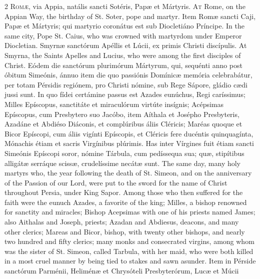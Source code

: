 \begin{paracol}{2}
\lettrine[lines=2]{R}{omæ,} via Appia, 
 natális sancti Sotéris, Papæ et Mártyris.
\switchcolumn
{}
\lettrine[lines=2]{A}{t} Rome, on the Appian Way, the 
 birthday of St. Soter, pope and martyr.
\switchcolumn*
{}
Item Romæ sancti Caji, 
 Papæ et Mártyris; qui martyrio coronátus est sub Diocletiáno Príncipe.
\switchcolumn
{}
In the same city, Pope St. Caius, 
 who was crowned with martyrdom under Emperor Diocletian.
\switchcolumn*
{}
Smyrnæ sanctórum 
 Apéllis et Lúcii, ex primis Christi discípulis.
\switchcolumn
{}
At Smyrna, the Saints Apelles and 
 Lucius, who were among the first disciples of Christ.
\switchcolumn*
{}
Eódem die sanctórum 
 plurimórum Mártyrum, qui, sequénti anno post óbitum Simeónis, ánnuo item die 
 quo passiónis Domínicæ memória celebrabátur, per totam Pérsidis regiónem, 
 pro Christi nómine, sub Rege Sápore, gládio cædi jussi sunt. In quo 
 fídei certámine passus est Azades eunúchus, Regi caríssimus; Milles 
 Epíscopus, sanctitáte et miraculórum virtúte insígnis; Acépsimas Epíscopus, 
 cum Presbytero suo Jacóbo, item Aíthala et Josépho Presbyteris, Azadáne et 
 Abdiéso Diáconis, et complúribus áliis Cléricis; Maréas quoque et Bicor 
 Epíscopi, cum áliis vigínti Epíscopis, et Cléricis fere ducéntis 
 quinquagínta, Mónachis étiam et sacris Virgínibus plúrimis. Has inter 
 Vírgines fuit étiam sancti Simeónis Epíscopi soror, nómine Tárbula, cum 
 pedíssequa sua; quæ, stipítibus alligátæ serráque scissæ, crudelíssime 
 necátæ sunt.
\switchcolumn
{}
The same day, many holy martyrs 
 who, the year following the death of St. Simeon, and on the anniversary of 
 the Passion of our Lord, were put to the sword for the name of Christ 
 throughout Persia, under King Sapor. Among those who then suffered for 
 the faith were the eunuch Azades, a favorite of the king; Milles, a bishop 
 renowned for sanctity and miracles; Bishop Acepsimas with one of his priests 
 named James; also Aithalas and Joseph, priests; Azadan and Abdiesus, 
 deacons, and many other clerics; Mareas and Bicor, bishop, with twenty other 
 bishops, and nearly two hundred and fifty clerics; many monks and 
 consecrated virgins, among whom was the sister of St. Simeon, called Tarbula, 
 with her maid, who were both killed in a most cruel manner by being tied to 
 stakes and sawn asunder.
\switchcolumn*
{}
Item in Pérside 
 sanctórum Parménii, Heliménæ et Chrysóteli Presbyterórum, Lucæ et Múcii 

\end{paracol}

